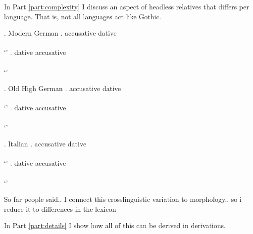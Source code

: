 In Part \ref{part:complexity} I discuss an aspect of headless relatives that differs per language. That is, not all languages act like Gothic.

\ex. Modern German
\ag. accusative dative\\
 \\
 `'
\bg. dative accusative\\
 \\
 `'

 \ex. Old High German
 \ag. accusative dative\\
  \\
  `'
 \bg. dative accusative\\
  \\
  `'

  \ex. Italian
  \ag. accusative dative\\
   \\
   `'
  \bg. dative accusative\\
   \\
   `'

So far people said..
I connect this crosslinguistic variation to morphology.. so i reduce it to differences in the lexicon

In Part \ref{part:details} I show how all of this can be derived in derivations.
